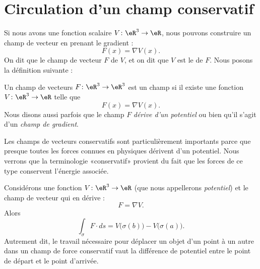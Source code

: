 \section{Circulation d'un champ conservatif}

Si nous avons une fonction scalaire \( V\colon \eR^3\to \eR\), nous pouvons construire un champ de vecteur en prenant le gradient :
\begin{equation}
	F(x)=\nabla V(x).
\end{equation}
On dit que le champ de vecteur \( F\)  de \( V\), et on dit que \( V\) est le  de \( F\). Nous posons la définition suivante :
\begin{definition}
	Un champ de vecteurs \( F\colon \eR^3\to \eR^3\) est un champ  si il existe une fonction \( V\colon \eR^3\to \eR\) telle que
	\begin{equation}
		F(x)=\nabla V(x).
	\end{equation}
	Nous disons aussi parfois que le champ \( F\) \emph{dérive d'un potentiel} ou bien qu'il s'agit d'un \emph{champ de gradient}.
\end{definition}

Les champs de vecteurs conservatifs sont particulièrement importants parce que presque toutes les forces connues en physiques dérivent d'un potentiel. Nous verrons que la terminologie «conservatif» provient du fait que les forces de ce type conservent l'énergie associée.


\begin{proposition}
	Considérons une fonction \( V\colon \eR^3\to \eR\) (que nous appellerons \emph{potentiel}) et le champ de vecteur qui en dérive :
	\begin{equation}
		F=\nabla V.
	\end{equation}
	Alors
	\begin{equation}
		\int_{\sigma}F\cdot ds=V\big( \sigma(b) \big)-V\big( \sigma(a) \big).
	\end{equation}
	Autrement dit, le travail nécessaire pour déplacer un objet d'un point à un autre dans un champ de force conservatif vaut la différence de potentiel entre le point de départ et le point d'arrivée.
\end{proposition}

